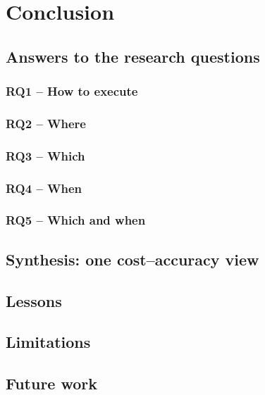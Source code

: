 \chapter{Conclusion}
\label{ch:conclusion}

\section{Answers to the research questions}
\subsection*{RQ1 -- How to execute}
\subsection*{RQ2 -- Where}
\subsection*{RQ3 -- Which}
\subsection*{RQ4 -- When}
\subsection*{RQ5 -- Which and when}

\section{Synthesis: one cost--accuracy view}

\section{Lessons}

\section{Limitations}

\section{Future work}
